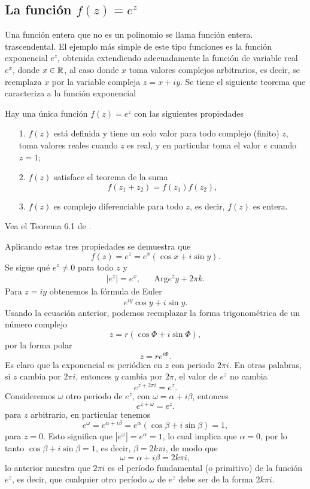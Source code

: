 \subsection{La función $f(z)=e^z$}
Una función entera que no es un polinomio se llama función entera.
trascendental. El ejemplo más simple de este tipo  funciones es la
función exponencial  $e^z$, obtenida extendiendo adecuadamente la
función de variable real $e^x$, donde $x\in\mathbb{R}$, al caso donde $x$ toma
valores complejos arbitrarios, es decir, se reemplaza $x$ por la variable compleja $z = x + iy$. Se tiene el siguiente teorema que caracteriza a la función exponencial
\begin{teor}
	Hay una  única función $f(z) = e^z$ con las siguientes propiedades
	\begin{itemize}
		\item [1.] $f(z)$ está definida y tiene un solo valor para todo complejo (finito) $z$, toma  valores reales cuando $z$ es real, y en particular toma el valor $e$ cuando $z = 1$;
		\item [2.] $f(z)$  satisface el teorema de la suma
		$$f(z_1+z_2)=f(z_1)f(z_2),$$
		\item [3.] $f(z)$ es complejo diferenciable para todo $z$, es decir, $f(z)$ es entera.
	\end{itemize}
\proof Vea el Teorema 6.1 de \cite{silverman}.\endproof 
\end{teor}
Aplicando estas tres propiedades se demuestra que 
$$f(z)=e^z=e^x(\cos x+i\sin y).$$
Se sigue qué $e^z\neq 0$ para todo $z$ y 
\[
	 \begin{array}{ccl}
	 	|e^z|=e^x,&&\mbox{Arg}e^zy+2\pi k.
	 \end{array}
\]
Para $z=iy$ obtenemos la fórmula de Euler
$$e^{iy}\cos y+i \sin y.$$
Usando la ecuación anterior, podemos reemplazar la forma trigonométrica de un número complejo
$$z=r(\cos\Phi+i\sin\Phi),$$
por la forma polar
$$z=re^{i\Phi}.$$
Es claro que la exponencial es periódica en $z$ con periodo $2\pi i$. En otras palabras, si $z$ cambia por $2\pi i$, entonces $y$ cambia por $2\pi$, el valor de $e^z$ no cambia
$$e^{z+2\pi i}=e^z.$$
Consideremos $\omega$ otro periodo de $e^z$, con $\omega=\alpha+i\beta$, entonces 
$$e^{z+\omega}=e^z.$$
para $z$ arbitrario, en particular tenemos
$$e^\omega=e^{\alpha+i\beta}=e^{\alpha}(\cos\beta+i\sin\beta)=1,$$
para $z=0$.  Esto significa que $|e^{\omega}|=e^\alpha=1$, lo cual implica que $\alpha=0$, por lo tanto $\cos\beta+i\sin\beta=1$, es decir, $\beta=2k\pi i$, de modo que 
$$\omega=\alpha+i\beta=2k\pi i,$$
lo anterior muestra que $2\pi i$ es el período fundamental (o primitivo) de la función $e^z$, es decir, que cualquier otro período $\omega$ de $e^z$ debe ser de la forma $2k\pi i$.\\
